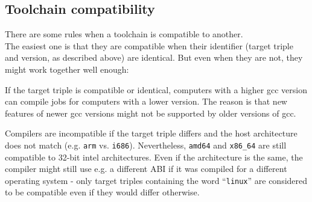 \documentclass[a4paper,9pt]{scrartcl}
\begin{document}
\subsection{Toolchain compatibility}

There are some rules when a toolchain is compatible to another.\\
The easiest one is that they are compatible when their identifier (target triple and version, as described above) are identical. But even when they are not, they might work together well enough:\\
\smallskip

If the target triple is compatible or identical, computers with a higher gcc version can compile jobs for computers with a lower version. The reason is that new features of newer gcc versions might not be supported by older versions of gcc.\\
\smallskip

Compilers are incompatible if the target triple differs and the host architecture does not match (e.g. \texttt{arm} vs. \texttt{i686}). Nevertheless, \texttt{amd64} and \texttt{x86\_64} are still compatible to 32-bit intel architectures. Even if the architecture is the same, the compiler might still use e.g. a different ABI if it was compiled for a different operating system - only target triples containing the word ``\texttt{linux}'' are considered to be compatible even if they would differ otherwise.
\end{document}

